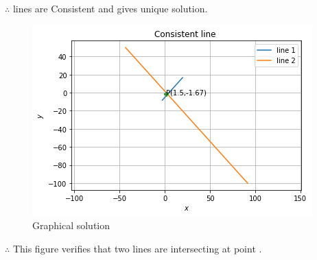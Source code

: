 \documentclass[journal,12pt,twocolumn]{IEEEtran}
\begin{document}
   $\therefore$ lines are Consistent and gives unique solution.
\begin{figure}[H]
    \includegraphics[width= \columnwidth]{consistent line.png}
    \caption{Graphical solution}
    \label{Fig:Graphical Solution}
\end{figure}
   $\therefore$ This figure verifies that two lines are intersecting at point .
\end{document}
